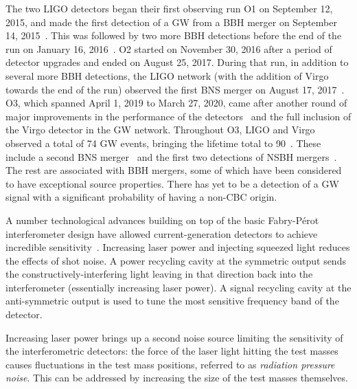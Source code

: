 The two \ac{LIGO} detectors began their first observing run \acs{O1} on September 12, 2015, and made the first detection of a \ac{GW} from a \ac{BBH} merger on September 14, 2015~\citep{gw150914}.
This was followed by two more \ac{BBH} detections before the end of the run on January 16, 2016~\citep{gwtc1}.
\Ac{O2} started on November 30, 2016 after a period of detector upgrades and ended on August 25, 2017.
During that run, in addition to several more \ac{BBH} detections, the \ac{LIGO} network (with the addition of Virgo towards the end of the run) observed the first \ac{BNS} merger on August 17, 2017~\citep{gw170817}.
\Ac{O3}, which spanned April 1, 2019 to March 27, 2020, came after another round of major improvements in the performance of the detectors~\citep{Buikema_2020} and the full inclusion of the Virgo detector in the \ac{GW} network.
Throughout \ac{O3}, \ac{LIGO} and Virgo observed a total of 74 \ac{GW} events, bringing the lifetime total to 90~\citep{gwtc2,gwtc3}.
These include a second \ac{BNS} merger~\citep{gw190425} and the first two detections of \ac{NSBH} mergers~\citep{nsbh_o3}.
The rest are associated with \ac{BBH} mergers, some of which have been considered to have exceptional source properties.
There has yet to be a detection of a \ac{GW} signal with a significant probability of having a non-\ac{CBC} origin.

A number technological advances building on top of the basic Fabry-P\'erot interferometer design have allowed current-generation detectors to achieve incredible sensitivity~\citep{aLIGO_design}.
Increasing laser power and injecting squeezed light reduces the effects of shot noise.
A power recycling cavity at the symmetric output sends the constructively-interfering light leaving in that direction back into the interferometer (essentially increasing laser power).
A signal recycling cavity at the anti-symmetric output is used to tune the most sensitive frequency band of the detector.

Increasing laser power brings up a second noise source limiting the sensitivity of the interferometric detectors: the force of the laser light hitting the test masses causes fluctuations in the test mass positions, referred to as \textit{radiation pressure noise}.
This can be addressed by increasing the size of the test masses themselves.


